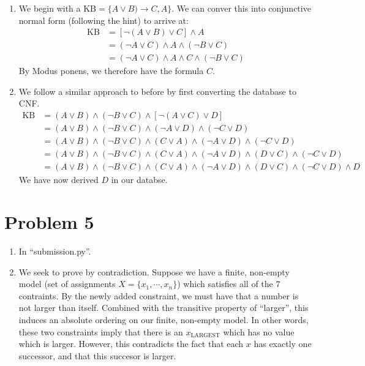 \documentclass[12pt]{article}
\begin{document}
\begin{enumerate}[label=(\alph*)]
  \item We begin with a $\text{KB} = \{A \lor B) \to C, A \}$. We can conver this into conjunctive normal form (following the hint) to arrive at:
  \begin{align*}
  \text{KB} &= [\lnot(A \lor B) \lor C] \land A \tag{apply hint} \\
  &= (\lnot A \lor C) \land A \land (\lnot B \lor C)  \tag{distribute the not} \\
  &= (\lnot A \lor C) \land A \land C \land (\lnot B \lor C) \tag{application of Modus ponens to $(\lnot A \lor C) \land A$}
  \end{align*}
  By Modus ponens, we therefore have the formula $C$. 
  \item We follow a similar approach to before by first converting the database to CNF.
  \begin{align*}
    \text{KB} &= (A \lor B) \land (\lnot B \lor C) \land [\lnot(A \lor C) \lor D] \tag{hint from previous problem} \\
    &= (A \lor B) \land (\lnot B \lor C) \land (\lnot A \lor D) \land (\lnot C \lor D) \tag{distributing the not} \\
    &= (A \lor B) \land (\lnot B \lor C) \land (C \lor A) \land (\lnot A \lor D) \land (\lnot C \lor D)  \tag{resolution rule applied to $(A \lor B) \land (\lnot B \lor C)$} \\
    &= (A \lor B) \land (\lnot B \lor C) \land (C \lor A) \land (\lnot A \lor D) \land (D \lor C) \land (\lnot C \lor D)  \tag{resolution rule applied to $(C \lor A) \land (\lnot A \lor D)$} \\
    &= (A \lor B) \land (\lnot B \lor C) \land (C \lor A) \land (\lnot A \lor D) \land (D \lor C) \land (\lnot C \lor D) \land D \tag{resolution rule applied to $(D \lor C) \land (\lnot C \lor D)$}
  \end{align*}
  We have now derived $D$ in our databse.
\end{enumerate}

\section*{Problem 5}

\begin{enumerate}[label=(\alph*)]
  \item In ``submission.py''.
  \item We seek to prove by contradiction. Suppose we have a finite, non-empty model (set of assignments $X = \{x_1, \cdots, x_n\}$) which satisfies all of the $7$ contraints. By the newly added constraint, we must have that a number is not larger than itself. Combined with the transitive property of ``larger'', this induces an absolute ordering on our finite, non-empty model. In other words, these two constraints imply that there is an $x_{\text{LARGEST}}$ which has no value which is larger. However, this contradicts the fact that each $x$ has exactly one successor, and that this succesor is larger.
\end{enumerate}
\end{document}

